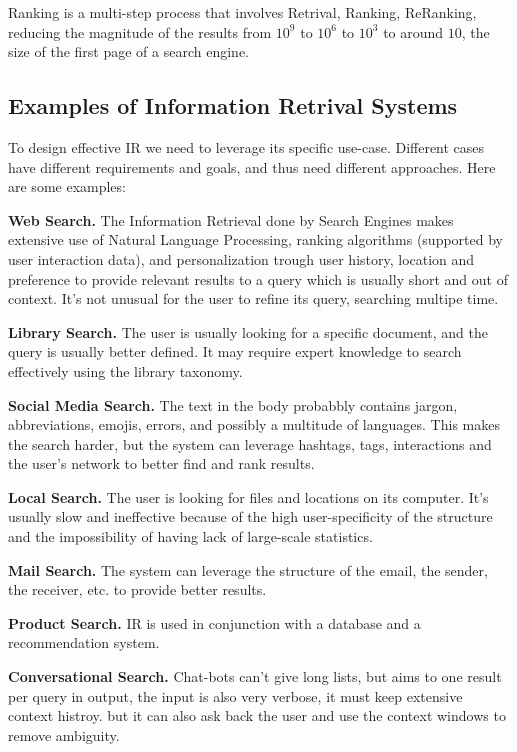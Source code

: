 \documentclass[a4paper]{tufte-handout}
\begin{document}
Ranking is a multi-step process that involves Retrival, Ranking, ReRanking, reducing the magnitude of the results from $10^9$ to $10^6$ to $10^3$ to around $10$, the size of the first page of a search engine.

\subsection{Examples of Information Retrival Systems}

To design effective IR we need to leverage its specific use-case. Different cases have different requirements and goals, and thus need different approaches. Here are some examples:

\textbf{Web Search.} The Information Retrieval done by Search Engines makes extensive use of Natural Language Processing, ranking algorithms (supported by user interaction data), and personalization trough user history, location and preference to provide relevant results to a query which is usually short and out of context. It's not unusual for the user to refine its query, searching multipe time.

\textbf{Library Search.} The user is usually looking for a specific document, and the query is usually better defined. It may require expert knowledge to search effectively using the library taxonomy.

\textbf{Social Media Search.} The text in the body probabbly contains jargon, abbreviations, emojis, errors, and possibly a multitude of languages. This makes the search harder, but the system can leverage hashtags, tags, interactions and the user's network to better find and rank results.

\textbf{Local Search.} The user is looking for files and locations on its computer. It's usually slow and ineffective because of the high user-specificity of the structure and the impossibility of having lack of large-scale statistics.

\textbf{Mail Search.} The system can leverage the structure of the email, the sender, the receiver, etc. to provide better results.

\textbf{Product Search.} IR is used in conjunction with a database and a recommendation system.

\textbf{Conversational Search.} Chat-bots can't give long lists, but aims to one result per query in output, the input is also very verbose, it must keep extensive context histroy. but it can also ask back the user and use the context windows to remove ambiguity.
\end{document}
